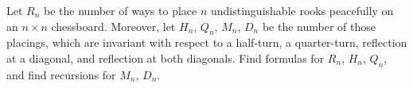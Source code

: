 Let $R_n$ be the number of ways to place $n$ undistinguishable rooks peacefully on an $n \times n$ chessboard. Moreover, let $H_n$, $Q_n$, $M_n$, $D_n$ be the number of those placings, which are invariant with respect to a half-turn, a quarter-turn, reflection at a diagonal, and reflection at both diagonals. Find formulas for $R_n$, $H_n$, $Q_n$, and find recursions for $M_n$, $D_n$.
